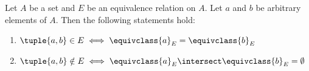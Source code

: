 \begin{thm}
    \label{thm:equivalent-classes-are-pairwise-disjoint}
    Let \( A \) be a set and \( E \) be an equivalence relation on \( A \).
    Let \( a \) and \( b \) be arbitrary elements of \( A \). Then the following
    statements hold:
    \begin{enumerate}[topsep=2pt,noitemsep,label=\texttt{\textup{(\alph*)}}]
        \item \( \tuple{a,b} \in E \iff \equivclass{a}_{E} = \equivclass{b}_{E} \) \label{enum:condition-for-ab-in-E}
        \item \( \tuple{a,b} \notin E \iff \equivclass{a}_{E} \intersect \equivclass{b}_{E} = \emptyset \) \label{enum:condition-for-ab-not-in-E}
    \end{enumerate}
\end{thm}

